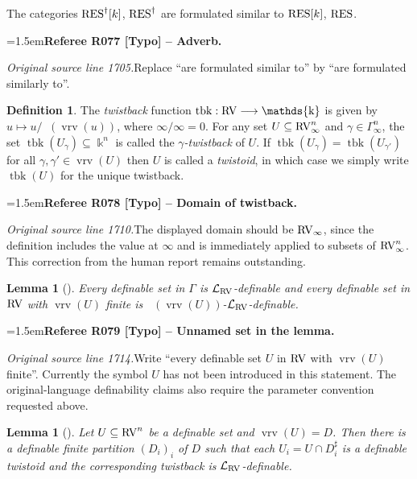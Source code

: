 \documentclass[12pt]{amsart}
\newcommand{\RefereeRemark}[4]{%
  \par\medskip\begingroup\normalfont\small\color{RefereePurple}%
  \emergencystretch=1.5em\noindent\textbf{Referee R#1 [#2] -- #3.}\par\nobreak\noindent #4\par
  \endgroup\medskip
}
\newcommand{\memph}[1]{{\color{magenta}\emph{#1}}}
\theoremstyle{plain}
\newtheorem{lem}[thm]{Lemma}
\theoremstyle{definition}
\newtheorem{defn}[thm]{Definition}
\theoremstyle{remark}
\numberwithin{equation}{section}
\theoremstyle{plain}
\newcommand{\RV}{\textup{RV}}
\DeclareMathOperator{\K}{\mathds{k}}
\newcommand{\0}{\emptyset}
\newcommand{\lan}[3]{\mathcal{L}_{#1 \textup{#2} #3}}
\newcommand{\fun}{\longrightarrow}
\newcommand{\efun}{\longmapsto}
\newcommand{\sub}{\subseteq}
\newcommand{\RES}{\textup{RES}}
\DeclareMathOperator{\rcsn}{\overline {csn}}
\DeclareMathOperator{\vrv}{vrv}
\DeclareMathOperator{\tbk}{tbk}
\begin{document}
The categories $\RES^\dag[k]$, $\RES^\dag$ are formulated similar to $\RES[k]$, $\RES$.

\RefereeRemark{077}{Typo}{Adverb}{%
\textit{Original source line 1705.}\quad Replace ``are formulated similar to'' by ``are formulated similarly to''.
}


\begin{defn}\label{twistback}
The \memph{twistback} function $\tbk : \RV \fun \K$ is given by $u \efun u / \rcsn(\vrv(u))$, where $\infty / \infty = 0$. For any set $U \sub \RV^n_\infty$ and $\gamma \in \Gamma_{\infty}^n$, the set $\tbk(U_{\gamma}) \sub \K^n$ is called the \memph{$\gamma$-twistback} of $U$. If $\tbk(U_{\gamma}) = \tbk(U_{\gamma'})$ for all $\gamma, \gamma' \in \vrv(U)$ then $U$ is called a \memph{twistoid}, in which case we simply write $\tbk(U)$ for the unique twistback.
\end{defn}

\RefereeRemark{078}{Typo}{Domain of twistback}{%
\textit{Original source line 1710.}\quad The displayed domain should be $\RV_\infty$, since the definition includes the value at $\infty$ and is immediately applied to subsets of $\RV_\infty^n$. This correction from the human report remains outstanding.
}

\begin{lem}[{\cite[Corollaries~2.23, 3.4]{Yin:int:expan:acvf}}]\label{gam:red:lrv}
Every definable set in $\Gamma$ is $\lan{}{RV}{}$-definable and every definable set in $\RV$ with $\vrv(U)$ finite is $\rcsn(\vrv(U))$-$\lan{}{RV}{}$-definable.
\end{lem}

\RefereeRemark{079}{Typo}{Unnamed set in the lemma}{%
\textit{Original source line 1714.}\quad Write ``every definable set $U$ in $\RV$ with $\vrv(U)$ finite''. Currently the symbol $U$ has not been introduced in this statement. The original-language definability claims also require the parameter convention requested above.
}

\begin{lem}[{\cite[Lemma~3.3]{Yin:int:expan:acvf}}]\label{shift:K:csn:def}
Let $U \sub \RV^n$ be a definable set and $\vrv(U) = D$. Then there is a definable finite partition $(D_i)_i$ of $D$ such that each $U_i = U \cap D_i^\sharp$ is a definable twistoid and the corresponding twistback is $\lan{}{RV}{}$-definable.
\end{lem}
\end{document}
